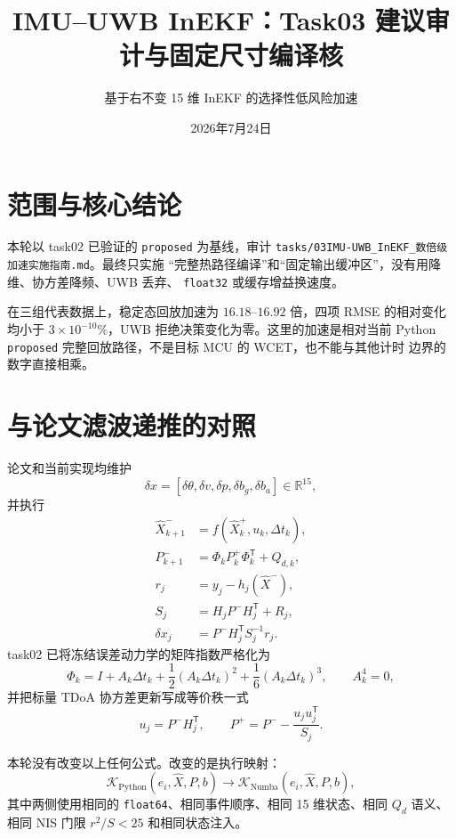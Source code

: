 \documentclass[11pt,a4paper]{ctexart}
\title{IMU--UWB InEKF：Task03 建议审计与固定尺寸编译核}
\author{基于右不变 15 维 InEKF 的选择性低风险加速}
\date{2026年7月24日}
\begin{document}
\maketitle

\section{范围与核心结论}

本轮以 task02 已验证的 \texttt{proposed} 为基线，审计
\texttt{tasks/03IMU-UWB\_InEKF\_数倍级加速实施指南.md}。最终只实施
“完整热路径编译”和“固定输出缓冲区”，没有用降维、协方差降频、UWB 丢弃、
\texttt{float32} 或缓存增益换速度。

在三组代表数据上，稳定态回放加速为 $16.18$--$16.92$ 倍，四项 RMSE 的相对变化
均小于 $3\times10^{-10}\%$，UWB 拒绝决策变化为零。这里的加速是相对当前
Python \texttt{proposed} 完整回放路径，不是目标 MCU 的 WCET，也不能与其他计时
边界的数字直接相乘。

\section{与论文滤波递推的对照}

论文和当前实现均维护
\begin{equation}
 \delta x=
 [\delta\theta,\delta v,\delta p,\delta b_g,\delta b_a]
 \in\mathbb{R}^{15},
\end{equation}
并执行
\begin{align}
 \hat X_{k+1}^{-}&=f(\hat X_k^{+},u_k,\Delta t_k),\\
 P_{k+1}^{-}&=\Phi_kP_k^{+}\Phi_k^{\mathsf T}+Q_{d,k},\\
 r_j&=y_j-h_j(\hat X^-),\\
 S_j&=H_jP^-H_j^{\mathsf T}+R_j,\\
 \delta x_j&=P^-H_j^{\mathsf T}S_j^{-1}r_j.
\end{align}
task02 已将冻结误差动力学的矩阵指数严格化为
\begin{equation}
 \Phi_k=I+A_k\Delta t_k+
 \frac12(A_k\Delta t_k)^2+
 \frac16(A_k\Delta t_k)^3,\qquad A_k^4=0,
\end{equation}
并把标量 TDoA 协方差更新写成等价秩一式
\begin{equation}
 u_j=P^-H_j^{\mathsf T},\qquad
 \boxed{P^+=P^--\frac{u_ju_j^{\mathsf T}}{S_j}}.
\end{equation}

本轮没有改变以上任何公式。改变的是执行映射：
\begin{equation}
 \mathcal{K}_{\mathrm{Python}}
 (e_i,\hat X,P,b)
 \longrightarrow
 \mathcal{K}_{\mathrm{Numba}}
 (e_i,\hat X,P,b),
\end{equation}
其中两侧使用相同的 \texttt{float64}、相同事件顺序、相同 15 维状态、相同
$Q_d$ 语义、相同 NIS 门限 $r^2/S<25$ 和相同状态注入。
\end{document}
